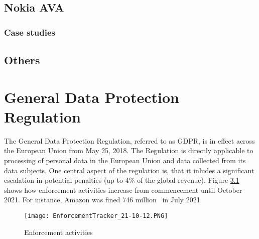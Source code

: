 \documentclass[a4paper,12pt]{report}
\begin{document}
	\section{Nokia AVA}
	\startsection
	\subsection{Case studies}
	\closesection	
	\section{Others}
	\startsection
	\closesection
	\chapter{General Data Protection Regulation}
	The General Data Protection Regulation, referred to as GDPR, is in effect across the European Union from May 25, 2018.
	The Regulation is directly applicable to processing of personal data in the European Union and data collected from its data subjects.
	One central aspect of the regulation is, that it inludes a significant escalation in potential penalties (up to 4\% of the global revenue).
	Figure \ref{fig:enforcement_tracker} shows how enforcement activities increase from commencement until October 2021.
	For instance, Amazon was fined 746 million \texteuro \ in July 2021 \cite{EnforcementTracker}
	\begin{figure}
		\texttt{[image: EnforcementTracker\_21-10-12.PNG]}
		\caption{Enforcement activities \cite{EnforcementTracker}}
		\label{fig:enforcement_tracker}
	\end{figure}
	
\end{document}
